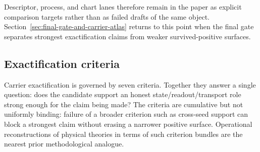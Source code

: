 \documentclass[11pt]{article}
\theoremstyle{definition}
\begin{document}
Descriptor, process, and chart lanes therefore remain in the paper as explicit
comparison targets rather than as failed drafts of the same object. Section~\ref{sec:final-gate-and-carrier-atlas}
returns to this point when the final gate separates strongest exactification claims
from weaker survived-positive surfaces.

\subsection{Exactification criteria}

Carrier exactification is governed by seven criteria. Together they answer a single
question: does the candidate support an honest state/readout/transport role strong
enough for the claim being made? The criteria are cumulative but not uniformly binding:
failure of a broader criterion such as cross-seed support can block a strongest claim
without erasing a narrower positive surface. Operational reconstructions of physical
theories in terms of such criterion bundles \citep{Hardy2001,ChiribellaDArianoPerinotti2011}
are the nearest prior methodological analogue.
\end{document}
